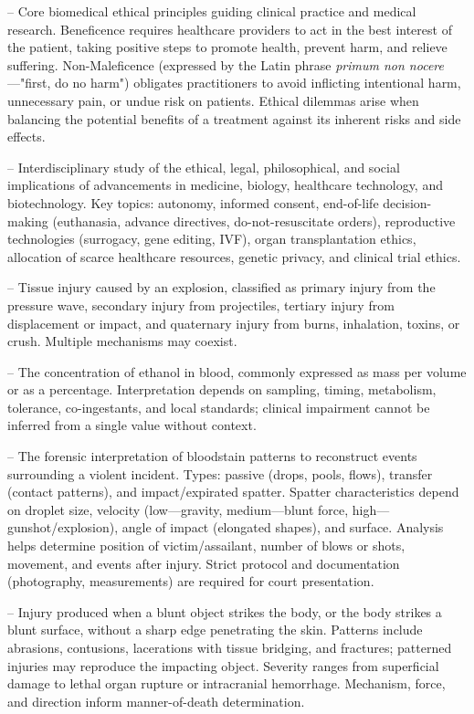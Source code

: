 -- Core biomedical ethical principles guiding clinical practice and medical research. Beneficence requires healthcare providers to act in the best interest of the patient, taking positive steps to promote health, prevent harm, and relieve suffering. Non-Maleficence (expressed by the Latin phrase \textit{primum non nocere}—"first, do no harm") obligates practitioners to avoid inflicting intentional harm, unnecessary pain, or undue risk on patients. Ethical dilemmas arise when balancing the potential benefits of a treatment against its inherent risks and side effects.

-- Interdisciplinary study of the ethical, legal, philosophical, and social implications of advancements in medicine, biology, healthcare technology, and biotechnology. Key topics: autonomy, informed consent, end-of-life decision-making (euthanasia, advance directives, do-not-resuscitate orders), reproductive technologies (surrogacy, gene editing, IVF), organ transplantation ethics, allocation of scarce healthcare resources, genetic privacy, and clinical trial ethics.

-- Tissue injury caused by an explosion, classified as primary injury from the pressure wave, secondary injury from projectiles, tertiary injury from displacement or impact, and quaternary injury from burns, inhalation, toxins, or crush. Multiple mechanisms may coexist.

-- The concentration of ethanol in blood, commonly expressed as mass per volume or as a percentage. Interpretation depends on sampling, timing, metabolism, tolerance, co-ingestants, and local standards; clinical impairment cannot be inferred from a single value without context.

-- The forensic interpretation of bloodstain patterns to reconstruct events surrounding a violent incident. Types: passive (drops, pools, flows), transfer (contact patterns), and impact/expirated spatter. Spatter characteristics depend on droplet size, velocity (low—gravity, medium—blunt force, high—gunshot/explosion), angle of impact (elongated shapes), and surface. Analysis helps determine position of victim/assailant, number of blows or shots, movement, and events after injury. Strict protocol and documentation (photography, measurements) are required for court presentation.

-- Injury produced when a blunt object strikes the body, or the body strikes a blunt surface, without a sharp edge penetrating the skin. Patterns include abrasions, contusions, lacerations with tissue bridging, and fractures; patterned injuries may reproduce the impacting object. Severity ranges from superficial damage to lethal organ rupture or intracranial hemorrhage. Mechanism, force, and direction inform manner-of-death determination.

